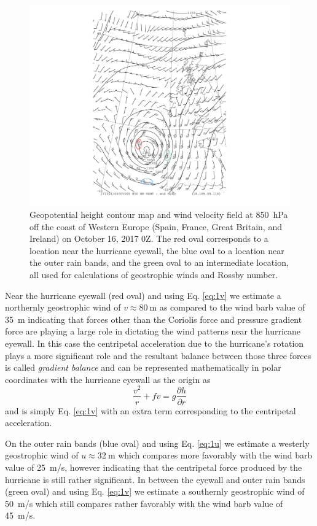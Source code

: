 \documentclass[11pt]{article}
\newcommand\p[2]{\frac{\partial #1}{\partial #2}}
\begin{document}
\begin{figure}[h!]
	\centering
	\includegraphics[trim={3.5cm 1cm 3.5cm 0},clip,width=\textwidth]{850hPa_hght_wind_ophelia}
	\caption{Geopotential height contour map and wind velocity field at \SI{850}{\hecto\Pa} off the coast of Western Europe (Spain, France, Great Britain, and Ireland) on October 16, 2017 0Z. The red oval corresponds to a location near the hurricane eyewall, the blue oval to a location near the outer rain bands, and the green oval to an intermediate location, all used for calculations of geostrophic winds and Rossby number.}
	\label{fig:ophelia}
\end{figure}

Near the hurricane eyewall (red oval) and using Eq. \ref{eq:1v} we estimate a northernly geostrophic wind of $v \approx \SI{80}{\m}$ as compared to the wind barb value of \SI{35}{\m} indicating that forces other than the Coriolis force and pressure gradient force are playing a large role in dictating the wind patterns near the hurricane eyewall. In this case the centripetal acceleration due to the hurricane's rotation plays a more significant role and the resultant balance between those three forces is called \emph{gradient balance} and can be represented mathematically in polar coordinates with the hurricane eyewall as the origin as
\begin{equation*}
	\frac{v^2}{r} + fv = g\p{h}{r}
\end{equation*}
and is simply Eq. \eqref{eq:1v} with an extra term corresponding to the centripetal acceleration.

On the outer rain bands (blue oval) and using Eq. \ref{eq:1u} we estimate a westerly geostrophic wind of $u \approx \SI{32}{\m}$ which compares more favorably with the wind barb value of \SI{25}{\m/\s}, however indicating that the centripetal force produced by the hurricane is still rather significant. In between the eyewall and outer rain bands (green oval) and using Eq. \ref{eq:1v} we estimate a southernly geostrophic wind of \SI{50}{\m/\s} which still compares rather favorably with the wind barb value of \SI{45}{\m/\s}.
\end{document}
